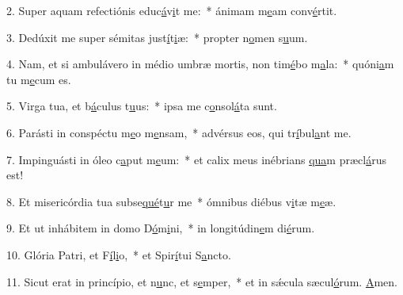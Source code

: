 2. Super aquam refectiónis educ\uline{á}v\uline{i}t me:~* ánimam m\uline{e}am conv\uline{é}rtit.\par 
3. Dedúxit me super sémitas just\uline{í}t\uline{i}æ:~* propter n\uline{o}men s\uline{u}um.\par 
4. Nam, et si ambulávero in médio umbræ mortis, non tim\uline{é}bo m\uline{a}la:~* quóni\uline{a}m tu m\uline{e}cum es.\par 
5. Virga tua, et b\uline{á}culus t\uline{u}us:~* ipsa me c\uline{o}nsol\uline{á}ta sunt.\par 
6. Parásti in conspéctu m\uline{e}o m\uline{e}nsam,~* advérsus eos, qui tr\uline{í}bul\uline{a}nt me.\par 
7. Impinguásti in óleo c\uline{a}put m\uline{e}um:~* et calix meus inébrians \uline{qua}m præcl\uline{á}rus est!\par 
8. Et misericórdia tua subse\uline{qué}t\uline{u}r me~* ómnibus diébus v\uline{i}tæ m\uline{e}æ.\par 
9. Et ut inhábitem in domo D\uline{ó}m\uline{i}ni,~* in longitúdin\uline{e}m di\uline{é}rum.\par 
10. Glória Patri, et F\uline{í}l\uline{i}o,~* et Spir\uline{í}tui S\uline{a}ncto.\par 
11. Sicut erat in princípio, et n\uline{u}nc, et s\uline{e}mper,~* et in sǽcula sæcul\uline{ó}rum. \uline{A}men.\par 
